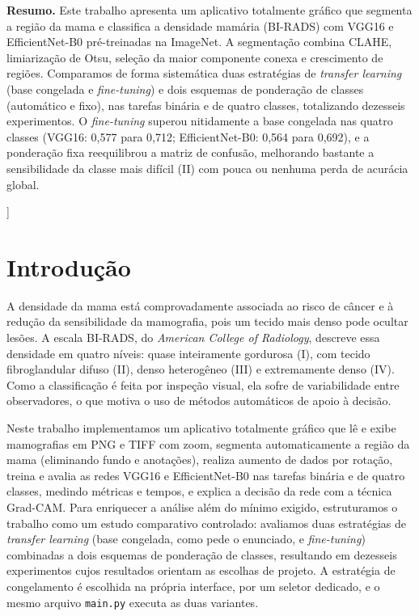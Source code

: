 \documentclass[twocolumn,a4paper,11pt]{article}
\begin{document}
{\begin{minipage}{0.90\textwidth}
\vspace{0.6em}
\noindent\textbf{Resumo.}
Este trabalho apresenta um aplicativo totalmente gráfico que segmenta a região da
mama e classifica a densidade mamária (BI\nobreakdash-RADS) com VGG16 e EfficientNet\nobreakdash-B0
pré\nobreakdash-treinadas na ImageNet. A segmentação combina CLAHE, limiarização de Otsu,
seleção da maior componente conexa e crescimento de regiões. Comparamos de forma
sistemática duas estratégias de \emph{transfer learning} (base congelada e
\emph{fine\nobreakdash-tuning}) e dois esquemas de ponderação de classes (automático e fixo),
nas tarefas binária e de quatro classes, totalizando dezesseis experimentos. O
\emph{fine\nobreakdash-tuning} superou nitidamente a base congelada nas quatro classes (VGG16:
0,577 para 0,712; EfficientNet\nobreakdash-B0: 0,564 para 0,692), e a ponderação fixa
reequilibrou a matriz de confusão, melhorando bastante a sensibilidade da classe
mais difícil (II) com pouca ou nenhuma perda de acurácia global.
\end{minipage}
\vspace{1.6em}
}]

\section{Introdução}

A densidade da mama está comprovadamente associada ao risco de câncer e à redução
da sensibilidade da mamografia, pois um tecido mais denso pode ocultar lesões. A
escala BI\nobreakdash-RADS, do \textit{American College of Radiology}, descreve essa densidade
em quatro níveis: quase inteiramente gordurosa (I), com tecido fibroglandular
difuso (II), denso heterogêneo (III) e extremamente denso (IV). Como a
classificação é feita por inspeção visual, ela sofre de variabilidade entre
observadores, o que motiva o uso de métodos automáticos de apoio à decisão.

Neste trabalho implementamos um aplicativo totalmente gráfico que lê e exibe
mamografias em PNG e TIFF com zoom, segmenta automaticamente a região da mama
(eliminando fundo e anotações), realiza aumento de dados por rotação, treina e
avalia as redes VGG16 e EfficientNet\nobreakdash-B0 nas tarefas binária e de quatro classes,
medindo métricas e tempos, e explica a decisão da rede com a técnica Grad\nobreakdash-CAM.
Para enriquecer a análise além do mínimo exigido, estruturamos o trabalho como um
estudo comparativo controlado: avaliamos duas estratégias de \emph{transfer
learning} (base congelada, como pede o enunciado, e \emph{fine\nobreakdash-tuning})
combinadas a dois esquemas de ponderação de classes, resultando em dezesseis
experimentos cujos resultados orientam as escolhas de projeto. A estratégia de
congelamento é escolhida na própria interface, por um seletor dedicado, e o mesmo
arquivo \texttt{main.py} executa as duas variantes.
\end{document}
